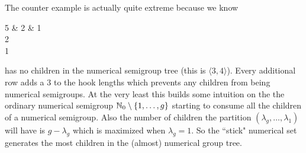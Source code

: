     The counter example is actually quite extreme because we know {\tiny \begin{ytableau} 5 & 2 & 1 \\ 2 \\ 1 \end{ytableau}} has no children in the numerical semigroup tree (this is \(\langle 3 , 4 \rangle\)). Every additional row adds a \(3\) to the hook lengths which prevents any children from being numerical semigroups. At the very least this builds some intuition on the the ordinary numerical semigroup \(\mathbb{N}_0 \setminus \{1, \dots, g\}\) starting to consume all the children of a numerical semigroup. Also the number of children the partition \((\lambda_g, \dots, \lambda_1)\) will have is \(g - \lambda_g\) which is maximized when \(\lambda_g = 1\). So the ``stick" numerical set generates the most children in the (almost) numerical group tree.
